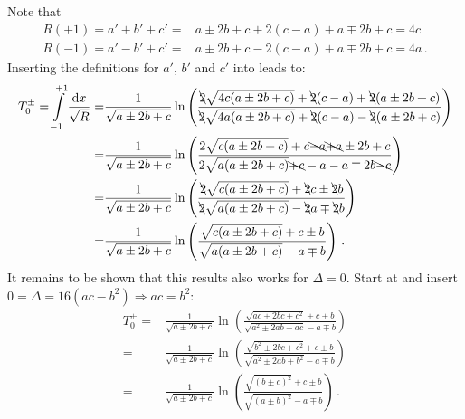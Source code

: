 Note that
\begin{align}
 R(+1) = a' + b' + c' =& a \pm 2 b + c + 2 (c - a) + a \mp 2 b + c =  4 c \label{eqn:four_c} \\
 R(-1) = a' - b' + c' =& a \pm 2 b + c - 2 (c - a) + a \mp 2 b + c =  4 a \label{eqn:four_a} \, .
\end{align}
Inserting the definitions for $a'$, $b'$ and $c'$ into  leads to:
\begin{align}
T^{\pm}_0 = \int\limits_{-1}^{+1} \frac{\mathrm{d}x}{\sqrt{R}}
 =& \frac{1}{\sqrt{a \pm 2 b + c}}
    \ln \left( \frac{ \bcancel{2} \sqrt{ 4 c (a \pm 2 b + c)} + \bcancel{2} (c-a) + \bcancel{2} (a \pm 2 b + c) }
                    { \bcancel{2} \sqrt{ 4 a (a \pm 2 b + c)} + \bcancel{2} (c-a) - \bcancel{2} (a \pm 2 b + c) } \right) \nonumber \\
 =& \frac{1}{\sqrt{a \pm 2 b + c}}
    \ln \left( \frac{ 2 \sqrt{ c (a \pm 2 b + c)}          +c \bcancel{-a} \bcancel{+a} \pm 2 b          +c  }
                    { 2 \sqrt{ a (a \pm 2 b + c)} \bcancel{+c}         -a           - a \mp 2 b \bcancel{-c} } \right) \nonumber \\
 =& \frac{1}{\sqrt{a \pm 2 b + c}}
    \ln \left( \frac{ \bcancel{2} \sqrt{ c (a \pm 2 b + c)} +\bcancel{2}c \pm \bcancel{2} b }
                    { \bcancel{2} \sqrt{ a (a \pm 2 b + c)} -\bcancel{2}a \mp \bcancel{2} b } \right) \nonumber \\
 =& \frac{1}{\sqrt{a \pm 2 b + c}}
    \ln \left( \frac{ \sqrt{ c (a \pm 2 b + c)} +c \pm b }
                    { \sqrt{ a (a \pm 2 b + c)} -a \mp b } \right) \, . \label{eqn:t_pm_0}
\end{align}
It remains to be shown that this results also works for $\Delta=0$.
Start at  and insert $0=\Delta=16\left(ac-b^2\right) \Rightarrow ac = b^2$:
\begin{align}
    T^{\pm}_0
 =& \frac{1}{\sqrt{a \pm 2 b + c}}
    \ln \left( \frac{ \sqrt{ a c \pm 2 b c + c^2} +c \pm b }
                    { \sqrt{ a^2 \pm 2 a b + a c} -a \mp b } \right) \nonumber \\
 =& \frac{1}{\sqrt{a \pm 2 b + c}}
    \ln \left( \frac{ \sqrt{ b^2 \pm 2 b c + c^2} +c \pm b }
                    { \sqrt{ a^2 \pm 2 a b + b^2} -a \mp b } \right) \nonumber \\
 =& \frac{1}{\sqrt{a \pm 2 b + c}}
    \ln \left( \frac{ \sqrt{ \left(b \pm c \right)^2 } +c \pm b }
                    { \sqrt{ \left(a \pm b \right)^2 } -a \mp b } \right) \, .
\end{align}
